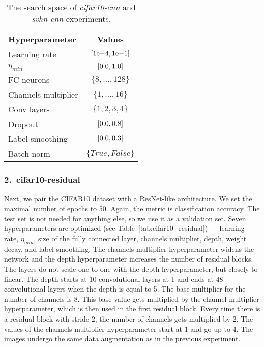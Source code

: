 \begin{table}
    \centering
    \begin{tabular}{lc}
        \toprule
        Hyperparameter & Values \\
        \midrule
        Learning rate & $\interval{1\mathrm{e}{-4}}{1\mathrm{e}{-1}}$ \\
        $\eta_{min}$ & $\interval{0.0}{1.0}$ \\
        FC neurons & $\{8,\ldots , 128\}$ \\
        Channels multiplier & $\{1, \ldots , 16\}$ \\
        Conv layers & $\{1,2,3, 4\}$ \\
        Dropout & $\interval{0.0}{0.8}$ \\
        Label smoothing & $\interval{0.0}{0.3}$ \\
        Batch norm & $\{True, False\}$ \\
        \bottomrule
    \end{tabular}
    \caption{The search space of \textit{cifar10-cnn} and \textit{svhn-cnn} experiments.}
    \label{tab:cifar10_simple}
\end{table}

\subsubsection{2.\ cifar10-residual}
Next, we pair the CIFAR10 dataset with a ResNet-like architecture. We set the maximal number of epochs to 50. Again, the metric is classification accuracy. The test set is not needed for anything else, so we use it as a validation set. Seven hyperparameters are optimized (see Table~\ref{tab:cifar10_residual}) --- learning rate, $\eta_{min}$, size of the fully connected layer, channels multiplier, depth, weight decay, and label smoothing. The channels multiplier hyperparameter widens the network and the depth hyperparameter increases the number of residual blocks. The layers do not scale one to one with the depth hyperparameter, but closely to linear. The depth starts at 10 convolutional layers at 1 and ends at 48 convolutional layers when the depth is equal to 5. The base multiplier for the number of channels is 8. This base value gets multiplied by the channel multiplier hyperparameter, which is then used in the first residual block. Every time there is a residual block with stride $2$, the number of channels gets multiplied by $2$. The values of the channels multiplier hyperparameter start at $1$ and go up to $4$. The images undergo the same data augmentation as in the previous experiment.

